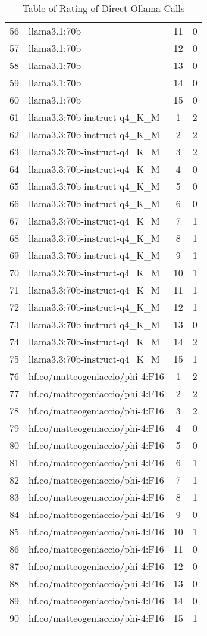 \begin{longtable}{|c|p{7cm}|c|c|}
56 & llama3.1:70b & 11 & 0 \\
57 & llama3.1:70b & 12 & 0 \\
58 & llama3.1:70b & 13 & 0 \\
59 & llama3.1:70b & 14 & 0 \\
60 & llama3.1:70b & 15 & 0 \\
61 & llama3.3:70b-instruct-q4\_K\_M & 1 & 2 \\
62 & llama3.3:70b-instruct-q4\_K\_M & 2 & 2 \\
63 & llama3.3:70b-instruct-q4\_K\_M & 3 & 2 \\
64 & llama3.3:70b-instruct-q4\_K\_M & 4 & 0 \\
65 & llama3.3:70b-instruct-q4\_K\_M & 5 & 0 \\
66 & llama3.3:70b-instruct-q4\_K\_M & 6 & 0 \\
67 & llama3.3:70b-instruct-q4\_K\_M & 7 & 1 \\
68 & llama3.3:70b-instruct-q4\_K\_M & 8 & 1 \\
69 & llama3.3:70b-instruct-q4\_K\_M & 9 & 1 \\
70 & llama3.3:70b-instruct-q4\_K\_M & 10 & 1 \\
71 & llama3.3:70b-instruct-q4\_K\_M & 11 & 1 \\
72 & llama3.3:70b-instruct-q4\_K\_M & 12 & 1 \\
73 & llama3.3:70b-instruct-q4\_K\_M & 13 & 0 \\
74 & llama3.3:70b-instruct-q4\_K\_M & 14 & 2 \\
75 & llama3.3:70b-instruct-q4\_K\_M & 15 & 1 \\
76 & hf.co/matteogeniaccio/phi-4:F16 & 1 & 2 \\
77 & hf.co/matteogeniaccio/phi-4:F16 & 2 & 2 \\
78 & hf.co/matteogeniaccio/phi-4:F16 & 3 & 2 \\
79 & hf.co/matteogeniaccio/phi-4:F16 & 4 & 0 \\
80 & hf.co/matteogeniaccio/phi-4:F16 & 5 & 0 \\
81 & hf.co/matteogeniaccio/phi-4:F16 & 6 & 1 \\
82 & hf.co/matteogeniaccio/phi-4:F16 & 7 & 1 \\
83 & hf.co/matteogeniaccio/phi-4:F16 & 8 & 1 \\
84 & hf.co/matteogeniaccio/phi-4:F16 & 9 & 0 \\
85 & hf.co/matteogeniaccio/phi-4:F16 & 10 & 1 \\
86 & hf.co/matteogeniaccio/phi-4:F16 & 11 & 0 \\
87 & hf.co/matteogeniaccio/phi-4:F16 & 12 & 0 \\
88 & hf.co/matteogeniaccio/phi-4:F16 & 13 & 0 \\
89 & hf.co/matteogeniaccio/phi-4:F16 & 14 & 0 \\
90 & hf.co/matteogeniaccio/phi-4:F16 & 15 & 1 \\
\bottomrule
\caption[]{Table of Rating of Direct Ollama Calls}
\end{longtable}
